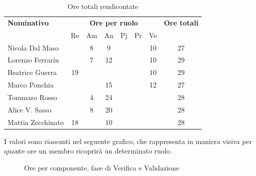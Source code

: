 \begin{table}[H]
	\centering
	\begin{tabular}{|l|c|c|c|c|c|c|c|}
		\hline
		\textbf{Nominativo} & 
		\multicolumn{6}{c|}{\textbf{Ore per ruolo}} & 
		\textbf{Ore totali} \\
		& Re & Am & An & Pj & Pr & Ve & \\
		\hline
		Nicola Dal Maso & & 8 & 9 & & & 10 & 27 \\
		Lorenzo Ferrarin & & 7 & 12 & & & 10 & 29 \\
		Beatrice Guerra & 19 & & & & & 10 & 29 \\
		Marco Ponchia & & & 15 & & & 12 & 27 \\
		Tommaso Rosso & & 4 & 24 & & & & 28 \\
		Alice V. Sasso & & 8 & 20 & & & & 28 \\
		Mattia Zecchinato & 18 & & 10 & & & & 28 \\
		\hline
	\end{tabular}
	\caption{Ore totali rendicontate}
\end{table}
I valori sono riassunti nel seguente grafico, che rappresenta in maniera visiva per quante ore un membro ricoprirà un determinato ruolo.
\begin{figure}[H]
	\centering
	\caption{Ore per componente, fase di Verifica e Validazione}
\end{figure}





